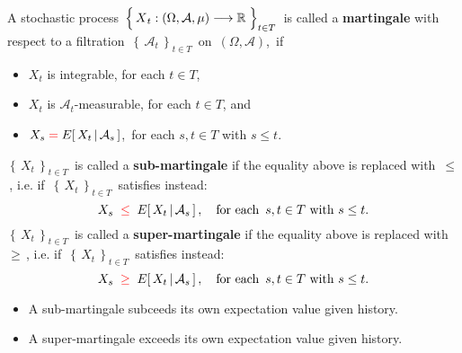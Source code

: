 
\begin{definition}
\mbox{}
\vskip 0.1cm
\noindent
A stochastic process
\,$\left\{\,\overset{{\color{white}.}}{X}_{t} : (\Omega,\mathcal{A},\mu) \longrightarrow \Re \;\right\}_{t \in T}$\,
is called a \textbf{martingale}
with respect to a filtration
\,$\left\{\,\mathcal{A}_{t}\,\right\}_{t \in T}$\, on \,$(\Omega,\mathcal{A})$,\,
if
\begin{itemize}
\item
	$X_{t}$ is integrable, for each $t \in T$,
\item
	$X_{t}$ is $\mathcal{A}_{t}$-measurable, for each $t \in T$, and
\item
	$X_{s} \; {\color{red}=} \; E\!\left[\,X_{t}\,\vert\,\mathcal{A}_{s}\,\right]$,\,
	for each $s, t \in T$ with $s \leq t$.
\end{itemize}
$\left\{\,X_{t}\,\right\}_{t \in T}$\, is called a \textbf{{\color{red}sub-}martingale}
if the equality above is replaced with \,{\color{red}$\leq$}\,,
i.e. if \,$\left\{\,X_{t}\,\right\}_{t \in T}$\, satisfies instead:
\begin{equation*}
X_{s} \;\; {\color{red}\leq} \;\; E\!\left[\,X_{t}\,\vert\,\mathcal{A}_{s}\,\right],
\quad
\textnormal{for each \,$s, t \in T$ with $s \leq t$}.
\end{equation*}
\vskip 0.1cm
\noindent
$\left\{\,X_{t}\,\right\}_{t \in T}$\, is called a \textbf{{\color{red}super-}martingale}
if the equality above is replaced with \,{\color{red}$\geq$}\,,
i.e. if \,$\left\{\,X_{t}\,\right\}_{t \in T}$\, satisfies instead:
\begin{equation*}
X_{s} \;\; {\color{red}\geq} \;\; E\!\left[\,X_{t}\,\vert\,\mathcal{A}_{s}\,\right],
\quad
\textnormal{for each \,$s, t \in T$ with $s \leq t$}.
\end{equation*}
\end{definition}


\begin{remark}
\mbox{}
\vskip -0.1cm
\noindent
\begin{itemize}
\item
	A {\color{red}sub-}martingale {\color{red}sub}ceeds its own expectation value given history.
\item
	A super-martingale exceeds its own expectation value given history.
\end{itemize}
\end{remark}

